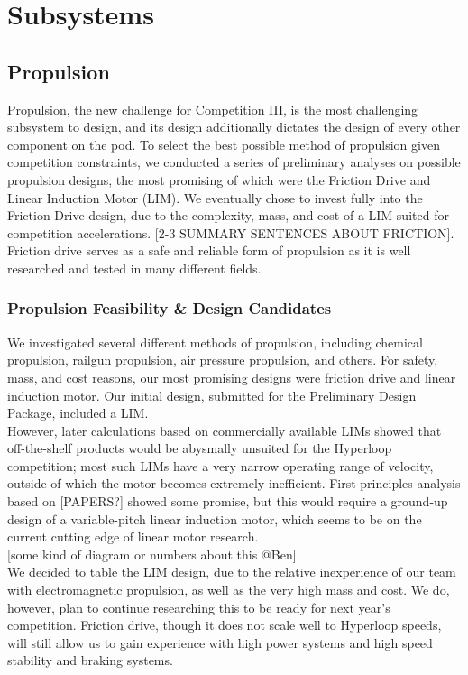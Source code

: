 \documentclass{report}
\begin{document}
    
    \chapter{Subsystems}
    
    \section{Propulsion}
    Propulsion, the new challenge for Competition III, is the most challenging subsystem to design, and its design additionally dictates the design of every other component on the pod. To select the best possible method of propulsion given competition constraints, we conducted a series of preliminary analyses on possible propulsion designs, the most promising of which were the Friction Drive and Linear Induction Motor (LIM). We eventually chose to invest fully into the Friction Drive design, due to the complexity, mass, and cost of a LIM suited for competition accelerations. [2-3 SUMMARY SENTENCES ABOUT FRICTION]. Friction drive serves as a safe and reliable form of propulsion as it is well researched and tested in many different fields.
    
    \subsection{Propulsion Feasibility \& Design Candidates}
    We investigated several different methods of propulsion, including chemical propulsion, railgun propulsion, air pressure propulsion, and others. For safety, mass, and cost reasons, our most promising designs were friction drive and linear induction motor. Our initial design, submitted for the Preliminary Design Package, included a LIM.\\
    
    However, later calculations based on commercially available LIMs showed that off-the-shelf products would be abysmally unsuited for the Hyperloop competition; most such LIMs have a very narrow operating range of velocity, outside of which the motor becomes extremely inefficient. First-principles analysis based on [PAPERS?] showed some promise, but this would require a ground-up design of a variable-pitch linear induction motor, which seems to be on the current cutting edge of linear motor research.\\
    
    [some kind of diagram or numbers about this @Ben]\\
    
    We decided to table the LIM design, due to the relative inexperience of our team with electromagnetic propulsion, as well as the very high mass and cost. We do, however, plan to continue researching this to be ready for next year’s competition. Friction drive, though it does not scale well to Hyperloop speeds, will still allow us to gain experience with high power systems and high speed stability and braking systems.\\
    
\end{document}
